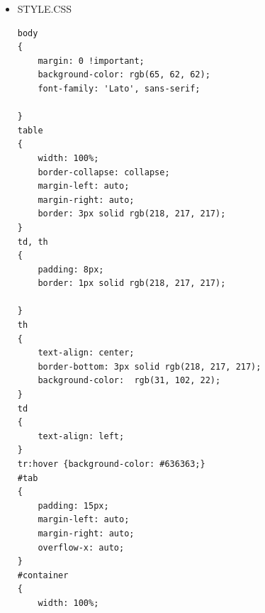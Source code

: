 \documentclass[12pt,a4paper]{article}
\begin{document}
\begin{itemize}
\begin{lstlisting}[language=Html]
                     <td>BEZTROSKA</td> 
                 </tr>
                 <tr>
                     <td>PIEPRZ</td>
                     <td>1010000 1001001 2120 143 1010010 1122 </td>
                     <td>PIEPRZ</td> 
                 </tr>
                 <tr>
                     <td>BILANS</td>
                     <td>1000010 1021 2211 145 2220 123 </td>
                     <td>BILANS</td> 
                 </tr>
                 <tr>
                     <td>MALPA</td>
                     <td>1001101 122 2211 212 1000001 </td>
                     <td>MALPA</td> 
                 </tr>
                 <tr>
                     <td>LOKOWKI</td>
                     <td>1001100 211 83 304 106 83 243 </td>
                     <td>LOKOWKI</td> 
                 </tr>
                 <tr>
                     <td>PARASOL</td>
                     <td>1010000 1000001 10001 1001 10002 304 84 </td>
                     <td>PARASOL</td> 
                 </tr>
                 <tr>
                     <td>KOMBINERKI</td>
                     <td>1001011 304 85 123 1021 2220 105 145 1023 243 </td>
                     <td>KOMBINERKI</td> 
                 </tr>
                 <tr>
                     <td>PLAKAT</td>
                     <td>1010000 1001100 145 2210 230 10010 </td>
                     <td>PLAKAT</td> 
                 </tr>
             </table>
             </div>
            <div id="txt">Ponizej zestwaienie czestowliwosci wystepowania danych systemow liczbowych </div> 
            <img src="images\plot.png"/>
        </div> 
           <div id="footer"> 
            &copy Konrad Lubera, RMS POLSL 
           </div> 
    </div> 
</body> 
	\end{lstlisting}
	
	\item STYLE.CSS
	\begin{lstlisting}
body
{
    margin: 0 !important;
    background-color: rgb(65, 62, 62);
    font-family: 'Lato', sans-serif;
    
}
table
{
    width: 100%;
    border-collapse: collapse;
    margin-left: auto;
    margin-right: auto;
    border: 3px solid rgb(218, 217, 217);
}
td, th
{
    padding: 8px;
    border: 1px solid rgb(218, 217, 217);
    
}
th
{
    text-align: center;
    border-bottom: 3px solid rgb(218, 217, 217);
    background-color:  rgb(31, 102, 22);
}
td
{
    text-align: left;
}
tr:hover {background-color: #636363;} 
#tab
{
    padding: 15px;
    margin-left: auto;
    margin-right: auto;
    overflow-x: auto;
}
#container
{
    width: 100%;
    

\end{lstlisting}
\end{itemize}
\end{document}
